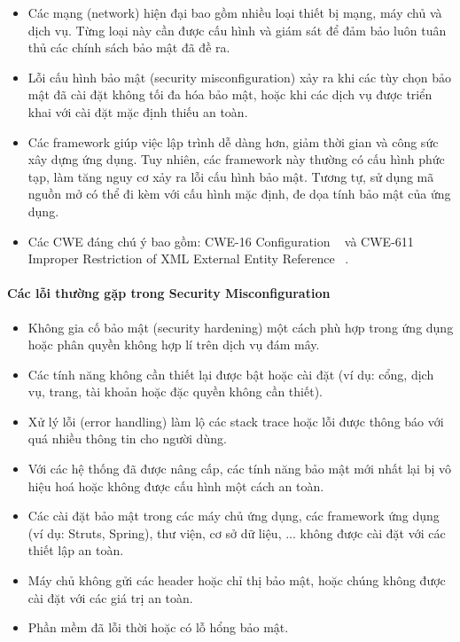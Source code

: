 \begin{itemize}
    \item Các mạng (network) hiện đại bao gồm nhiều loại thiết bị mạng, máy chủ và dịch vụ. Từng loại này cần được cấu hình và giám sát để đảm bảo luôn tuân thủ các chính sách bảo mật đã đề ra.
    \item Lỗi cấu hình bảo mật (security misconfiguration) xảy ra khi các tùy chọn bảo mật đã cài đặt không tối đa hóa bảo mật, hoặc khi các dịch vụ được triển khai với cài đặt mặc định thiếu an toàn.
    \item Các framework giúp việc lập trình dễ dàng hơn, giảm thời gian và công sức xây dựng ứng dụng. Tuy nhiên, các framework này thường có cấu hình phức tạp, làm tăng nguy cơ xảy ra lỗi cấu hình bảo mật. Tương tự, sử dụng mã nguồn mở có thể đi kèm với cấu hình mặc định, đe dọa tính bảo mật của ứng dụng.
    \item Các CWE đáng chú ý bao gồm: CWE-16 Configuration ~\cite{chap2bib24} và CWE-611 Improper Restriction of XML External Entity Reference ~\cite{chap2bib25}.
\end{itemize}

\paragraph{Các lỗi thường gặp trong Security Misconfiguration}

\begin{itemize}
    \item Không gia cố bảo mật (security hardening) một cách phù hợp trong ứng dụng hoặc phân quyền không hợp lí trên dịch vụ đám mây.
    \item Các tính năng không cần thiết lại được bật hoặc cài đặt (ví dụ: cổng, dịch vụ, trang, tài khoản hoặc đặc quyền không cần thiết).
    \item Xử lý lỗi (error handling) làm lộ các stack trace hoặc lỗi được thông báo với quá nhiều thông tin cho người dùng.
    \item Với các hệ thống đã được nâng cấp, các tính năng bảo mật mới nhất lại bị vô hiệu hoá hoặc không được cấu hình một cách an toàn.
    \item Các cài đặt bảo mật trong các máy chủ ứng dụng, các framework ứng dụng (ví dụ: Struts, Spring), thư viện, cơ sở dữ liệu, ... không được cài đặt với các thiết lập an toàn.
    \item Máy chủ không gửi các header hoặc chỉ thị bảo mật, hoặc chúng không được cài đặt với các giá trị an toàn.
    \item Phần mềm đã lỗi thời hoặc có lỗ hổng bảo mật.
\end{itemize}

